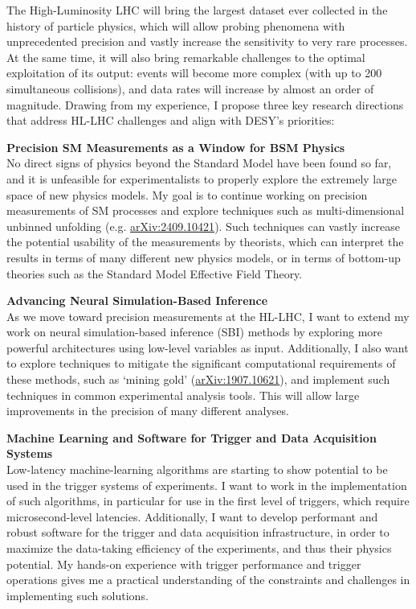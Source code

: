 \documentclass[11pt, a4paper]{awesome-cv}
\begin{document}
\begin{cvletter}
  The High-Luminosity LHC will bring the largest dataset ever collected in the history of particle physics, which will allow probing phenomena with unprecedented precision and vastly increase the sensitivity to very rare processes. At the same time, it will also bring remarkable challenges to the optimal exploitation of its output: events will become more complex (with up to 200 simultaneous collisions), and data rates will increase by almost an order of magnitude. Drawing from my experience, I propose three key research directions that address HL-LHC challenges and align with DESY's priorities:
  
  \textbf{Precision SM Measurements as a Window for BSM Physics}\\
  No direct signs of physics beyond the Standard Model have been found so far, and it is unfeasible for experimentalists to properly explore the extremely large space of new physics models. My goal is to continue working on precision measurements of SM processes and explore techniques such as multi-dimensional unbinned unfolding (e.g. \href{https://arxiv.org/abs/2409.10421}{arXiv:2409.10421}). Such techniques can vastly increase the potential usability of the measurements by theorists, which can interpret the results in terms of many different new physics models, or in terms of bottom-up theories such as the Standard Model Effective Field Theory.

  \textbf{Advancing Neural Simulation-Based Inference}\\
  As we move toward precision measurements at the HL-LHC, I want to extend my work on neural simulation-based inference (SBI) methods by exploring more powerful architectures using low-level variables as input. Additionally, I also want to explore techniques to mitigate the significant computational requirements of these methods, such as `mining gold' (\href{https://arxiv.org/abs/1907.10621}{arXiv:1907.10621}), and implement such techniques in common experimental analysis tools. This will allow large improvements in the precision of many different analyses.
  
  \textbf{Machine Learning and Software for Trigger and Data Acquisition Systems}\\
  Low-latency machine-learning algorithms are starting to show potential to be used in the trigger systems of experiments. I want to work in the implementation of such algorithms, in particular for use in the first level of triggers, which require microsecond-level latencies. Additionally, I want to develop performant and robust software for the trigger and data acquisition infrastructure, in order to maximize the data-taking efficiency of the experiments, and thus their physics potential. My hands-on experience with trigger performance and trigger operations gives me a practical understanding of the constraints and challenges in implementing such solutions.


\end{cvletter}
\end{document}

